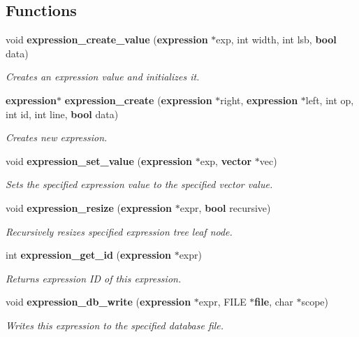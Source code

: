 \subsection*{Functions}
\begin{CompactItemize}
\item 
void {\bf expression\_\-create\_\-value} ({\bf expression} $\ast$exp, int width, int lsb, {\bf bool} data)
\begin{CompactList}\small\item\em Creates an expression value and initializes it.\item\end{CompactList}\item 
{\bf expression}$\ast$ {\bf expression\_\-create} ({\bf expression} $\ast$right, {\bf expression} $\ast$left, int op, int id, int line, {\bf bool} data)
\begin{CompactList}\small\item\em Creates new expression.\item\end{CompactList}\item 
void {\bf expression\_\-set\_\-value} ({\bf expression} $\ast$exp, {\bf vector} $\ast$vec)
\begin{CompactList}\small\item\em Sets the specified expression value to the specified vector value.\item\end{CompactList}\item 
void {\bf expression\_\-resize} ({\bf expression} $\ast$expr, {\bf bool} recursive)
\begin{CompactList}\small\item\em Recursively resizes specified expression tree leaf node.\item\end{CompactList}\item 
int {\bf expression\_\-get\_\-id} ({\bf expression} $\ast$expr)
\begin{CompactList}\small\item\em Returns expression ID of this expression.\item\end{CompactList}\item 
void {\bf expression\_\-db\_\-write} ({\bf expression} $\ast$expr, FILE $\ast${\bf file}, char $\ast$scope)
\begin{CompactList}\small\item\em Writes this expression to the specified database file.\item\end{CompactList}\item 

\end{CompactItemize}
